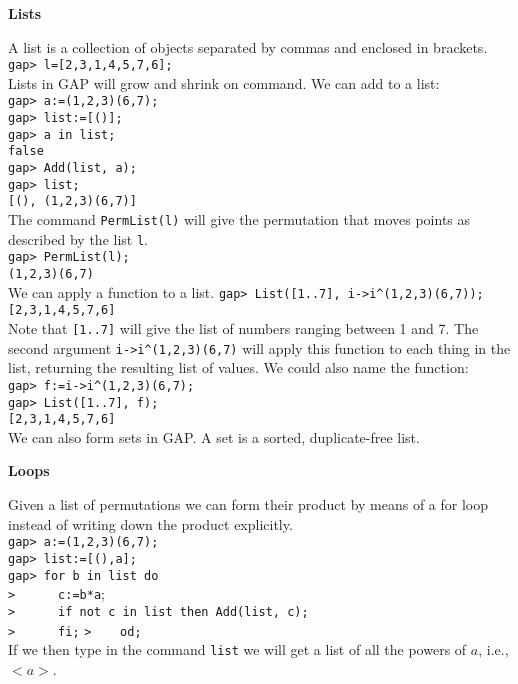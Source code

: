 \documentclass[12pt]{amsart}
\theoremstyle{definition}
\begin{document}
\begin{center}
\textbf{Lists}
\end{center}
A list is a collection of objects separated by commas and enclosed in brackets.\\
\verb"gap> l=[2,3,1,4,5,7,6];"\\
Lists in GAP will grow and shrink on command.  We can add to a list:\\
\verb"gap> a:=(1,2,3)(6,7);"\\
\verb"gap> list:=[()];"\\
\verb"gap> a in list;"\\
\verb"false"\\
\verb"gap> Add(list, a);"\\
\verb"gap> list;"\\
\verb"[(), (1,2,3)(6,7)]"\\
The command \verb"PermList(l)" will give the permutation that moves points as described by the list \verb"l".\\
\verb"gap> PermList(l);"\\
\verb"(1,2,3)(6,7)"\\
We can apply a function to a list.
\verb"gap> List([1..7], i->i^(1,2,3)(6,7));"\\
\verb"[2,3,1,4,5,7,6]"\\
Note that \verb"[1..7]" will give the list of numbers ranging between 1 and 7.  The second argument \verb"i->i^(1,2,3)(6,7)" will apply this function to each thing in the list, returning the resulting list of values.  We could also name the function:\\
\verb"gap> f:=i->i^(1,2,3)(6,7);"\\
\verb"gap> List([1..7], f);"\\
\verb"[2,3,1,4,5,7,6]"\\

We can also form sets in GAP.  A set is a sorted, duplicate-free list.

\begin{center}
\textbf{Loops}
\end{center}
Given a list of permutations we can form their product by means of a for loop instead of writing down the product explicitly.\\
\verb"gap> a:=(1,2,3)(6,7);"\\
\verb"gap> list:=[(),a];"\\
\verb"gap> for b in list do"\\
\verb">      c:=b*a";\\
\verb">      if not c in list then Add(list, c);"\\
\verb">      fi;"
\verb">    od;"\\
If we then type in the command \verb"list" we will get a list of all the powers of $a$, i.e., $<a>$.\\
\end{document}

